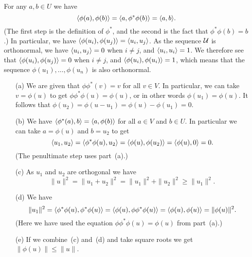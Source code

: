  For any $a,b\in U$ we have
 \[ \langle \phi(a),\phi(b)\rangle=\langle a,\phi^*\phi(b)\rangle=\langle a,b\rangle. \]
 (The first step is the definition of $\phi^*$, and the
 second is the fact that $\phi^*\phi(b)=b$.)  In particular,
 we have $\langle \phi(u_i),\phi(u_j)\rangle=\langle u_i,u_j\rangle$.  As the
 sequence ${\mathcal{U}}$ is orthonormal, we have $\langle u_i,u_j\rangle=0$
 when $i\neq j$, and $\langle u_i,u_i\rangle=1$.  We therefore see
 that $\langle \phi(u_i),\phi(u_j)\rangle=0$ when $i\neq j$, and
 $\langle \phi(u_i),\phi(u_i)\rangle=1$, which means that the sequence
 $\phi(u_1),\dotsc,\phi(u_n)$ is also orthonormal.
\EndDeferredSolution

 \begin{itemize}
  \item[(a)] We are given that $\phi\phi^*(v)=v$ for all
   $v\in V$.  In particular, we can take $v=\phi(u)$ to get
   $\phi\phi^*\phi(u)=\phi(u)$, or in other words
   $\phi(u_1)=\phi(u)$.  It follows that
   $\phi(u_2)=\phi(u-u_1)=\phi(u)-\phi(u_1)=0$.
  \item[(b)] We have $\langle \phi^*(a),b\rangle=\langle a,\phi(b)\rangle$ for
   all $a\in V$ and $b\in U$.  In particular we can take
   $a=\phi(u)$ and $b=u_2$ to get
   \[ \langle u_1,u_2\rangle = \langle \phi^*\phi(u),u_2\rangle =
      \langle \phi(u),\phi(u_2)\rangle =
      \langle \phi(u),0\rangle = 0.
   \]
   (The penultimate step uses part~(a).)
  \item[(c)] As $u_1$ and $u_2$ are orthogonal we have
   \[ \|u\|^2 = \|u_1+u_2\|^2 = \|u_1\|^2 + \|u_2\|^2 \geq
       \|u_1\|^2.
   \]
  \item[(d)] We have
   \[ \|u_1\|^2 = \langle \phi^*\phi(u),\phi^*\phi(u)\rangle =
       \langle \phi(u),\phi\phi^*\phi(u)\rangle = \langle \phi(u),\phi(u)\rangle
       = \|\phi(u)\|^2.
   \]
   (Here we have used the equation
   $\phi\phi^*\phi(u)=\phi(u)$ from part~(a).)
  \item[(e)] If we combine~(c) and~(d) and take square roots
   we get $\|\phi(u)\|\leq\|u\|$.
 \end{itemize}
\EndDeferredSolution

